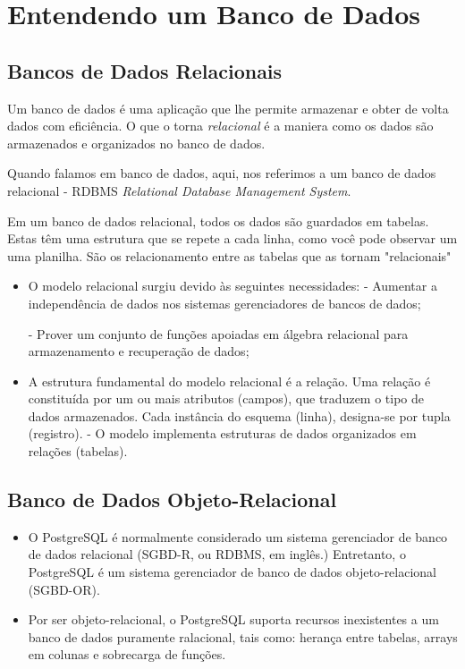 \newpage \chapter{Entendendo um Banco de Dados}\setcounter{SteP}{1}

\section{Bancos de Dados Relacionais}\setcounter{SteP}{1}
    
    Um banco de dados é uma aplicação que lhe permite armazenar 
e obter de volta dados com eficiência. O que o torna {\it relacional}
é a maniera como os dados são armazenados e organizados no
banco de dados.

    Quando falamos em banco de dados, aqui, nos referimos a um banco de dados
relacional - RDBMS {\it Relational Database Management System}.

    Em um banco de dados relacional, todos os dados são 
guardados em tabelas. Estas têm uma estrutura que se repete
a cada linha, como você pode observar um uma planilha.
São os relacionamento entre as tabelas que as tornam "relacionais"

\begin{itemize}
\item{\bf }O modelo relacional surgiu devido às seguintes necessidades:
     - Aumentar a independência de dados nos sistemas gerenciadores de bancos de dados;

     - Prover um conjunto de funções apoiadas em álgebra relacional
para armazenamento e recuperação de dados;

\item{\bf } A estrutura fundamental do modelo relacional é a relação.
Uma relação é constituída por um ou mais atributos (campos), que 
traduzem o tipo de dados armazenados. Cada instância do esquema (linha),
designa-se por tupla (registro).
     - O modelo implementa estruturas de dados organizados
em relações (tabelas).
\end{itemize}

\section{Banco de Dados Objeto-Relacional}\setcounter{SteP}{1}

\begin{itemize}
\item{\bf }O PostgreSQL é normalmente considerado um sistema gerenciador de 
banco de dados relacional (SGBD-R, ou RDBMS, em inglês.) Entretanto, 
o PostgreSQL é um sistema gerenciador de banco de dados objeto-relacional (SGBD-OR).

\item{\bf }Por ser objeto-relacional, o PostgreSQL suporta recursos inexistentes
a um banco de dados puramente ralacional, tais como: herança entre
tabelas, arrays em colunas e sobrecarga de funções.
\end{itemize}

